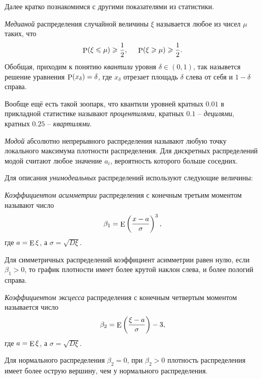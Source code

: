 Далее кратко познакомимся с другими показателями из статистики. 

\begin{to_def}
    \textit{Медианой} распределения случайной величины $\xi$ называется любое из чисел $\mu$ таких, что
    \begin{equation*}
        \P (\xi \leq \mu) \geq \frac{1}{2}, \hspace{5 mm}
        \P (\xi \geq \mu) \geq \frac{1}{2}.
    \end{equation*}
    Обобщая, приходим к понятию \textit{квантили} уровня $\delta \in (0, 1)$, так назывется решение уравнения $\P (x_\delta) = \delta$, где $x_\delta$ отрезает площадь $\delta$ слева от себя и $1-\delta$ справа. 
\end{to_def}

Вообще ещё есть такой зоопарк, что квантили уровней кратных $0.01$ в прикладной статистике называют \textit{процентилями}, кратных $0.1$ -- \textit{децилями}, кратных $0.25$  -- \textit{квартилями}.

\begin{to_def}
    \textit{Модой} абсолютно непрерывного распределения называют любую точку локального максимума плотности распределения. Для дискретных распределений модой считают любое значение $a_i$, вероятность которого больше соседних.
\end{to_def}

Для описания \textit{унимодеальных} распределений используют следующие величины:

\begin{to_def}
    \textit{Коэффициентом асимметрии} распределения с конечным третьим моментом называют число
    \begin{equation*}
        \beta_1 = \E \left(
            \frac{x-a}{\sigma}
        \right)^3,
    \end{equation*}
    где $a = \E \xi$,  а $\sigma = \sqrt{D \xi}$. 
\end{to_def}

Для симметричных распределений коэффициент асимметрии равен нулю, если $\beta_1 > 0$, то график плотности имеет более крутой наклон слева, и более пологий справа. 

\begin{to_def}
    \textit{Коэффициентом эксцесса} распределения с конечным четвертым моментом называется число
    \begin{equation*}
        \beta_2 = \E \left(
            \frac{\xi - a}{\sigma}
        \right) - 3,
    \end{equation*}
    где $a = \E \xi$,  а $\sigma = \sqrt{D \xi}$. 
\end{to_def}

Для нормального распределения $\beta_2 = 0$, при $\beta_2 > 0$ плотность распределения имеет более острую вершину, чем у нормального распределения. 


